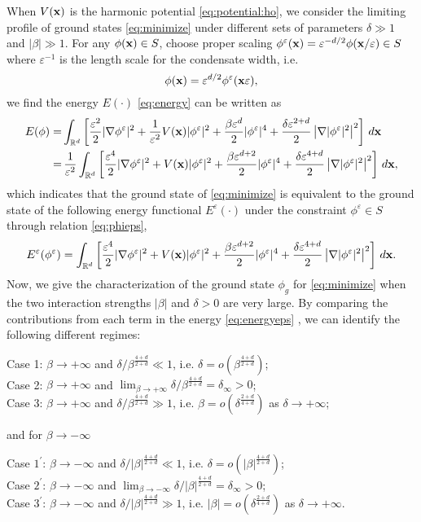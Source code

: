 \documentclass{elsarticle}
\newcommand{\vep}{\varepsilon}
\newcommand{\be}{\begin{equation}}
\newcommand{\ee}{\end{equation}}
\newcommand{\bx}{{\bf x} }
\begin{document}
When $V(\bx)$ is the harmonic potential \eqref{eq:potential:ho},  we consider the limiting profile of ground states \eqref{eq:minimize} under different sets of parameters $\delta\gg1$
and $|\beta|\gg1$.
For any $\phi(\bx)\in S$, choose proper scaling $\phi^\vep(\bx)=\vep^{-d/2}\phi(\bx/\vep)\in S$ where $\vep^{-1}$ is the length scale for the condensate width, i.e.
\be\label{eq:phieps}
\phi(\bx)=\vep^{d/2}\phi^\vep(\bx\vep),\ee we find the energy $E(\cdot)$ \eqref{eq:energy} can be written as
\begin{align}
E(\phi)=&\int_{\Bbb R^d}\left[\frac{\vep^2}{2}|\nabla\phi^\vep|^2+\frac{1}{\vep^2}V(\bx)|\phi^\vep|^2+\frac{\beta\vep^d}{2}|\phi^\vep|^4+\frac{\delta\vep^{2+d}}{2}\left|\nabla|\phi^\vep|^2\right|^2\right]\,d\bx
\nonumber\\
=&\,\frac{1}{\vep^2}\int_{\Bbb R^d}\left[\frac{\vep^{4}}{2}|\nabla\phi^\vep|^2+V(\bx)|\phi^\vep|^2+\frac{\beta\vep^{d+2}}{2}|\phi^\vep|^4+\frac{\delta\vep^{4+d}}{2}\left|\nabla|\phi^\vep|^2\right|^2\right]\,d\bx,
\end{align}
which indicates that the ground state of \eqref{eq:minimize} is equivalent to the ground state of the following energy functional $E^\vep(\cdot)$ under the constraint $\phi^\vep\in S$ through relation \eqref{eq:phieps},
\be\label{eq:energyeps}
E^\vep(\phi^\vep)=\int_{\Bbb R^d}\left[\frac{\vep^{4}}{2}|\nabla\phi^\vep|^2+V(\bx)|\phi^\vep|^2+\frac{\beta\vep^{d+2}}{2}|\phi^\vep|^4+\frac{\delta\vep^{4+d}}{2}\left|\nabla|\phi^\vep|^2\right|^2\right]\,d\bx.
\ee
Now, we give the characterization of the ground state $\phi_g$ for \eqref{eq:minimize} when the two interaction strengths $|\beta|$ and $\delta>0$ are very large.
By comparing the contributions from each term in the energy \eqref{eq:energyeps} \cite{Ruan}, we can identify the following different regimes:

 Case 1: $\beta\to +\infty$ and $\delta/\beta^{\frac{4+d}{2+d}}\ll1$, i.e. $\delta=o(\beta^{\frac{4+d}{2+d}})$;\\
 \hspace*{.4cm} Case 2: $\beta\to+\infty$ and $\lim_{\beta\to+\infty}\delta/\beta^{\frac{4+d}{2+d}}=\delta_\infty>0$;\\
 \hspace*{.4cm} Case 3: $\beta\to+\infty$ and  $\delta/\beta^{\frac{4+d}{2+d}}\gg1$, i.e. $\beta=o(\delta^{\frac{2+d}{4+d}})$ as $\delta\to+\infty$;

\noindent and for $\beta\to-\infty$

 Case $1^\prime$: $\beta\to -\infty$ and $\delta/|\beta|^{\frac{4+d}{2+d}}\ll1$, i.e. $\delta=o(|\beta|^{\frac{4+d}{2+d}})$;\\
 \hspace*{.4cm} Case $2^\prime$: $\beta\to-\infty$ and $\lim_{\beta\to-\infty}\delta/|\beta|^{\frac{4+d}{2+d}}=\delta_\infty>0$;\\
 \hspace*{.4cm} Case $3^\prime$: $\beta\to-\infty$ and  $\delta/|\beta|^{\frac{4+d}{2+d}}\gg1$, i.e. $|\beta|=o(\delta^{\frac{2+d}{4+d}})$ as $\delta\to+\infty$.
\end{document}
